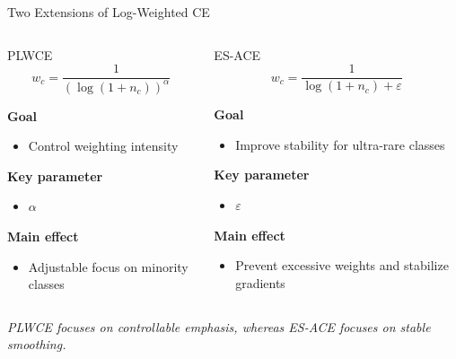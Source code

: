\documentclass[aspectratio=169]{beamer}
\renewcommand{\textbf}[1]{\textcolor{SejongBlue}{\sf\bfseries #1}}
\begin{document}
\begin{frame}{Two Extensions of Log-Weighted CE}

\vspace{-0.5em}

\begin{columns}[T,totalwidth=\textwidth]

\begin{mybox}[before skip=0pt, after skip=0pt, top=2pt, bottom=2pt]{PLWCE}
\[
w_c = \frac{1}{(\log(1+n_c))^{\alpha}}
\]

\textbf{Goal}
\begin{itemize}
  \item Control weighting intensity
\end{itemize}

\textbf{Key parameter}
\begin{itemize}
  \item $\alpha$
\end{itemize}

\textbf{Main effect}
\begin{itemize}
  \item Adjustable focus on minority classes
\end{itemize}
\end{mybox}

\begin{mybox}[before skip=0pt, after skip=0pt, top=2pt, bottom=2pt]{ES-ACE}
\[
w_c = \frac{1}{\log(1+n_c) + \varepsilon}
\]

\textbf{Goal}
\begin{itemize}
  \item Improve stability for ultra-rare classes
\end{itemize}

\textbf{Key parameter}
\begin{itemize}
  \item $\varepsilon$
\end{itemize}

\textbf{Main effect}
\begin{itemize}
  \item Prevent excessive weights and stabilize gradients
\end{itemize}
\end{mybox}

\end{columns}

\vspace{0.25em}
\centering
{\small \textit{PLWCE focuses on controllable emphasis, whereas ES-ACE focuses on stable smoothing.}}

\end{frame}
\end{document}
